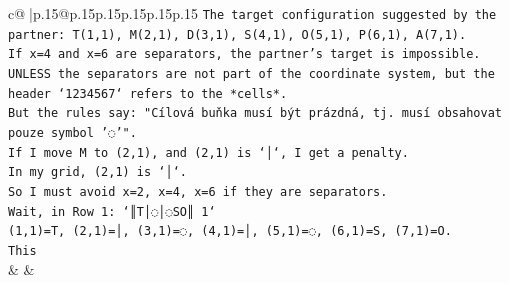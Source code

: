 \documentclass{article}
\begin{document}
{\begin{supertabular}{c@{$\;$}|p{.15\linewidth}@{}p{.15\linewidth}p{.15\linewidth}p{.15\linewidth}p{.15\linewidth}p{.15\linewidth}}
{{{\texttt{The target configuration suggested by the partner: T(1,1), M(2,1), D(3,1), S(4,1), O(5,1), P(6,1), A(7,1).} \\
\texttt{If x=4 and x=6 are separators, the partner's target is impossible.} \\
\texttt{UNLESS the separators are not part of the coordinate system, but the header `1234567` refers to the *cells*.} \\
\texttt{But the rules say: "Cílová buňka musí být prázdná, tj. musí obsahovat pouze symbol '◌'".} \\
\texttt{If I move M to (2,1), and (2,1) is `│`, I get a penalty.} \\
\texttt{In my grid, (2,1) is `│`.} \\
\texttt{So I must avoid x=2, x=4, x=6 if they are separators.} \\
\texttt{Wait, in Row 1: `║T│◌│◌SO║ 1`} \\
\texttt{(1,1)=T, (2,1)=│, (3,1)=◌, (4,1)=│, (5,1)=◌, (6,1)=S, (7,1)=O.} \\
\texttt{This} \\
            }
        }
    }
    & & \\ \\


\end{supertabular}}
\end{document}
